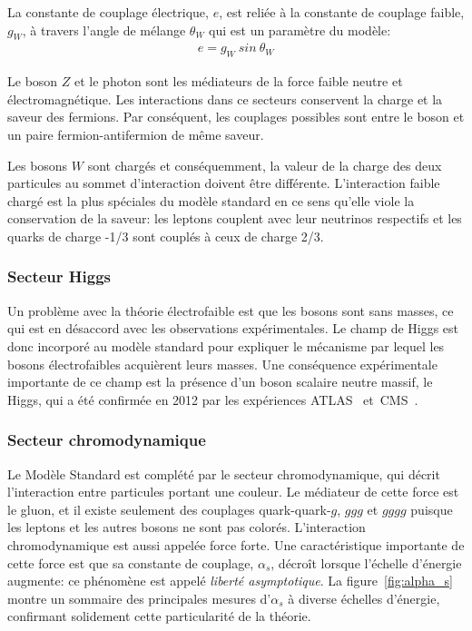 La constante de couplage électrique, $e$, est reliée à la constante de
couplage faible, $g_W$, à travers l'angle de mélange $\theta_W$ qui
est un paramètre du modèle: 
\begin{eqnarray}
\label{eq:egw}
  e = g_W\ sin\ \theta_W
\end{eqnarray}

Le boson $Z$ et le photon sont les médiateurs de la force faible
neutre et électromagnétique. Les interactions dans ce secteurs
conservent la charge et la saveur des fermions. Par
conséquent, les couplages possibles sont entre le boson et un paire
fermion-antifermion de même saveur.

Les bosons $W$ sont chargés et conséquemment, la valeur de la charge
des deux particules au sommet d'interaction doivent être différente. L'interaction
faible chargé est la plus spéciales du modèle standard en ce sens
qu'elle viole la conservation de la saveur: les leptons couplent avec
leur neutrinos respectifs et les quarks de charge -1/3 sont
couplés à ceux de charge 2/3.

\subsubsection{Secteur Higgs}
Un problème avec la théorie électrofaible est que les bosons sont sans
masses, ce qui est en désaccord avec les observations
expérimentales. Le champ de Higgs est donc incorporé au modèle
standard pour expliquer le mécanisme par lequel les bosons
électrofaibles acquièrent leurs masses. Une conséquence expérimentale
importante de ce champ est la présence d'un boson scalaire neutre
massif, le Higgs, qui a été confirmée en 2012 par les expériences
ATLAS~\cite{aad_observation_2012}
et~CMS~\cite{chatrchyan_observation_2012}.

\subsubsection{Secteur chromodynamique}
Le Modèle Standard est complété par le secteur chromodynamique, qui
décrit l'interaction entre particules portant une couleur. Le
médiateur de cette force est le gluon, et il existe seulement des
couplages quark-quark-$g$, $ggg$ et $gggg$ puisque les leptons et les
autres bosons ne sont pas colorés. L'interaction chromodynamique est
aussi appelée force forte. Une caractéristique importante de cette
force est que sa constante de couplage, $\alpha_s$, décroît lorsque
l'échelle d'énergie augmente: ce phénomène est appelé \emph{liberté
  asymptotique}. La figure~\ref{fig:alpha_s} montre un sommaire des
principales mesures d'$\alpha_s$ à diverse échelles d'énergie,
confirmant solidement cette particularité de la théorie.

